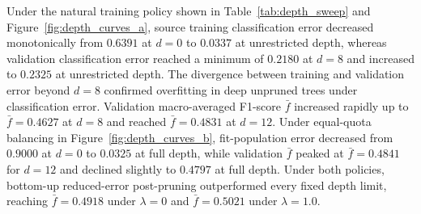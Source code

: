 Under the natural training policy shown in Table~\ref{tab:depth_sweep} and Figure~\ref{fig:depth_curves_a}, source training classification error decreased monotonically from $0.6391$ at $d = 0$ to $0.0337$ at unrestricted depth, whereas validation classification error reached a minimum of $0.2180$ at $d = 8$ and increased to $0.2325$ at unrestricted depth. The divergence between training and validation error beyond $d = 8$ confirmed overfitting in deep unpruned trees under classification error. Validation macro-averaged F1-score $\bar{f}$ increased rapidly up to $\bar{f} = 0.4627$ at $d = 8$ and reached $\bar{f} = 0.4831$ at $d = 12$. Under equal-quota balancing in Figure~\ref{fig:depth_curves_b}, fit-population error decreased from $0.9000$ at $d = 0$ to $0.0325$ at full depth, while validation $\bar{f}$ peaked at $\bar{f} = 0.4841$ for $d = 12$ and declined slightly to $0.4797$ at full depth. Under both policies, bottom-up reduced-error post-pruning outperformed every fixed depth limit, reaching $\bar{f} = 0.4918$ under $\lambda = 0$ and $\bar{f} = 0.5021$ under $\lambda = 1.0$.

